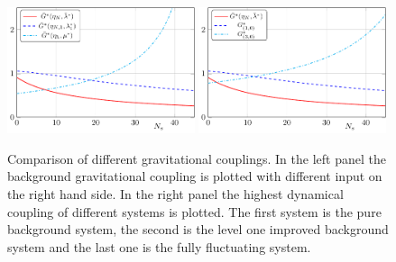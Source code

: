 \documentclass[11pt]{book} %
\begin{document}
{\begin{figure}
\includegraphics[width=0.49\textwidth]{Background-g-comparison}
\hfill
\includegraphics[width=0.49\textwidth]{Fluctuation-g-comparison}
\caption{Comparison of different gravitational couplings.
In the left panel the background gravitational coupling is plotted with different input on the right hand side.
In the right panel the highest dynamical coupling of different systems is plotted.
The first system is the pure background system, the second is the level one improved background system and the last one is the fully fluctuating system.}
\label{fig:Comparison-of-g}
\end{figure}

}
\end{document}

